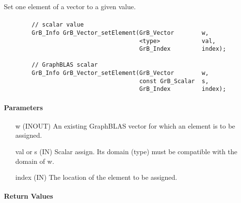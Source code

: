 Set one element of a vector to a given value.

\paragraph{\syntax}

\begin{verbatim}
        // scalar value
        GrB_Info GrB_Vector_setElement(GrB_Vector        w,
                                       <type>            val,
                                       GrB_Index         index);

        // GraphBLAS scalar
        GrB_Info GrB_Vector_setElement(GrB_Vector        w,
                                       const GrB_Scalar  s,
                                       GrB_Index         index);
\end{verbatim}

\paragraph{Parameters}

\begin{itemize}[leftmargin=1.1in]
    \item[{\sf w}]   ({\sf INOUT}) An existing GraphBLAS vector for which an 
    element is to be assigned.

    \item[{\sf val} or {\sf s}]   ({\sf IN}) Scalar assign.  Its domain (type) must
    be compatible with the domain of {\sf w}.

    \item[{\sf index}] ({\sf IN}) The location of the element to be assigned.
\end{itemize}

\paragraph{Return Values}

